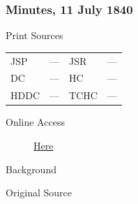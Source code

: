 		\subsubsection{Minutes, 11 July 1840}
			\label{EMS-1840-JS-11-JUL-1840}
			
			\begin{description}
				\item[Print Sources]
			\end{description}

			\begin{tabular}{p{0.5in}p{1in}p{0.5in}p{1in}}
				JSP	 	& ---		& JSR 		& --- \\
				DC	 	& ---		& HC 		& --- \\
				HDDC 	& ---		& TCHC 		& --- \\
			\end{tabular}
			
			\begin{description}
				\item[Online Access] \href{https://www.josephsmithpapers.org/paper-summary/minutes-11-july-1840/1}{Here}
			\end{description}
			
			\begin{description}
				\item[Background]
			\end{description}
			
			
			\begin{description}
				\item[Original Source]
			\end{description}
			
			
